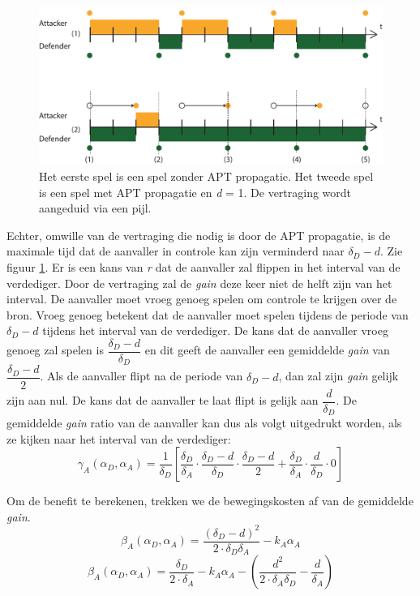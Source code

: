 \documentclass[master=cws, masteroption=vs,english]{kulemt}
\begin{document}
\begin{abstract*}
\begin{figure}[hbtp]
\centering
\includegraphics[scale=0.6]{../../doc/template/Images/Delayuitgelegd}
\caption{Het eerste spel is een spel zonder APT propagatie. Het tweede spel is een spel met APT propagatie en \textit{d} = 1. De vertraging wordt aangeduid via een pijl.}
\label{fig:delaycase1}
\end{figure}


Echter, omwille van de vertraging die nodig is door de APT propagatie, is de maximale tijd dat de aanvaller in controle kan zijn verminderd naar $\delta_{D}-d$. Zie figuur \ref{fig:delaycase1}.  Er is een kans van \textit{r} dat de aanvaller zal flippen in het interval van de verdediger. Door de vertraging zal de \textit{gain} deze keer niet de helft zijn van het interval. De aanvaller moet vroeg genoeg spelen om controle te krijgen over de bron. Vroeg genoeg betekent dat de aanvaller moet spelen tijdens de periode van $\delta_{D}-d$ tijdens het interval van de verdediger. De kans dat de aanvaller vroeg genoeg zal spelen is $\dfrac{\delta_{D}-d}{\delta_{D}}$ en dit geeft de aanvaller een gemiddelde \textit{gain} van $\dfrac{\delta_{D}-d}{2}$. Als de aanvaller flipt na de periode van $\delta_{D}-d$, dan zal zijn \textit{gain} gelijk zijn aan nul. De kans dat de aanvaller te laat flipt is gelijk aan $\dfrac{d}{\delta_{D}}$. De gemiddelde \textit{gain} ratio van de aanvaller kan dus als volgt uitgedrukt worden, als ze kijken naar het interval van de verdediger:
\begin{equation}\label{first}
\gamma_{A}(\alpha_{D},\alpha_{A}) = \dfrac {1}{\delta_{D}} [ \dfrac{\delta_{D}}{\delta_{A}} \cdot \dfrac{\delta_{D}-d}{\delta_{D}} \cdot \dfrac{\delta_{D}-d}{2} + \dfrac{\delta_{D}}{\delta_{A}} \cdot \dfrac{d}{\delta_{D}} \cdot 0 ]
\end{equation}

Om de benefit te berekenen, trekken we de bewegingskosten af van de gemiddelde \textit{gain}.
\begin{equation}\label{first}
\beta_{A}(\alpha_{D},\alpha_{A}) = \dfrac { (\delta_{D}-d) ^{2}} {2 \cdot \delta_{D}  \delta_{A}} - k_{A} \alpha_{A}
\end{equation}
\begin{equation}\label{first}
\beta_{A}(\alpha_{D},\alpha_{A}) = \dfrac { \delta_{D}} {2 \cdot \delta_{A}} - k_{A} \alpha_{A} - ( \dfrac{d^{2}}{2 \cdot \delta_{A} \delta_{D}} - \dfrac{d}{\delta_{A}} )
\end{equation}
 

\end{abstract*}
\end{document}
